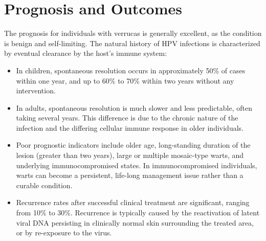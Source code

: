 \section*{Prognosis and Outcomes}
The prognosis for individuals with verrucas is generally excellent, as the condition is benign and self-limiting. The natural history of HPV infections is characterized by eventual clearance by the host's immune system:
\begin{itemize}
    \item In children, spontaneous resolution occurs in approximately 50\% of cases within one year, and up to 60\% to 70\% within two years without any intervention.
    \item In adults, spontaneous resolution is much slower and less predictable, often taking several years. This difference is due to the chronic nature of the infection and the differing cellular immune response in older individuals.
    \item Poor prognostic indicators include older age, long-standing duration of the lesion (greater than two years), large or multiple mosaic-type warts, and underlying immunocompromised states. In immunocompromised individuals, warts can become a persistent, life-long management issue rather than a curable condition.
    \item Recurrence rates after successful clinical treatment are significant, ranging from 10\% to 30\%. Recurrence is typically caused by the reactivation of latent viral DNA persisting in clinically normal skin surrounding the treated area, or by re-exposure to the virus.
\end{itemize}

